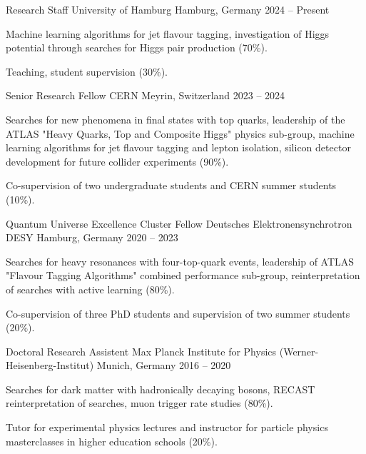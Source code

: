 \begin{cventries}

    \cventry
      {Research Staff} %
      {University of Hamburg} %
      {Hamburg, Germany} %
      {2024 -- Present} %
      {
        \begin{cvitems} %
          \item {Machine learning algorithms for jet flavour tagging, investigation of Higgs potential through searches for Higgs pair production (70\%).}
          \item {Teaching, student supervision (30\%).}
        \end{cvitems}
      }

    \cventry
      {Senior Research Fellow} %
      {CERN} %
      {Meyrin, Switzerland} %
      {2023 -- 2024} %
      {
        \begin{cvitems} %
          \item {Searches for new phenomena in final states with top quarks, leadership of the ATLAS "Heavy Quarks, Top and Composite Higgs" physics sub-group, machine learning algorithms for jet flavour tagging and lepton isolation, silicon detector development for future collider experiments (90\%).}
          \item {Co-supervision of two undergraduate students and CERN summer students (10\%).}
        \end{cvitems}
      }
  
    \cventry
      {Quantum Universe Excellence Cluster Fellow} %
      {Deutsches Elektronensynchrotron DESY} %
      {Hamburg, Germany} %
      {2020 -- 2023} %
      {
        \begin{cvitems} %
          \item {Searches for heavy resonances with four-top-quark events, leadership of ATLAS "Flavour Tagging Algorithms" combined performance sub-group, reinterpretation of searches with active learning (80\%). }
          \item {Co-supervision of three PhD students and supervision of two summer students (20\%).}
        \end{cvitems}
      }
  
    \cventry
      {Doctoral Research Assistent} %
      {Max Planck Institute for Physics (Werner-Heisenberg-Institut)} %
      {Munich, Germany} %
      {2016 -- 2020} %
      {
        \begin{cvitems} %
          \item {Searches for dark matter with hadronically decaying bosons, RECAST reinterpretation of searches, muon trigger rate studies (80\%).}
          \item {Tutor for experimental physics lectures and instructor for particle physics masterclasses in higher education schools (20\%).}
        \end{cvitems}
      }
  
  \end{cventries}
  